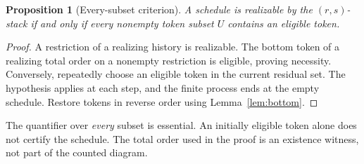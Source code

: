 \documentclass[11pt]{article}
\newtheorem{proposition}[theorem]{Proposition}
\theoremstyle{definition}\newtheorem{definition}[theorem]{Definition}
\theoremstyle{remark}\newtheorem{remark}[theorem]{Remark}
\begin{document}
\begin{proposition}[Every-subset criterion]\label{prop:peeling}
A schedule is realizable by the $(r,s)$-stack if and only if every nonempty token subset $U$ contains an eligible token.
\end{proposition}
\begin{proof}
A restriction of a realizing history is realizable. The bottom token of a realizing total order on a nonempty restriction is eligible, proving necessity. Conversely, repeatedly choose an eligible token in the current residual set. The hypothesis applies at each step, and the finite process ends at the empty schedule. Restore tokens in reverse order using Lemma~\ref{lem:bottom}.
\end{proof}
The quantifier over \emph{every} subset is essential. An initially eligible token alone does not certify the schedule. The total order used in the proof is an existence witness, not part of the counted diagram.
\end{document}
